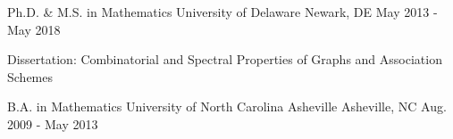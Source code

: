 \begin{cventries}
  \cventry
    {Ph.D. \& M.S. in Mathematics}
    {University of Delaware}
    {Newark, DE}
    {May 2013 - May 2018}
    {
      \begin{cvitems}
        \item {Dissertation: Combinatorial and Spectral Properties of Graphs and Association Schemes}
      \end{cvitems}
    }
  \cventry
    {B.A. in Mathematics}
    {University of North Carolina Asheville}
    {Asheville, NC}
    {Aug. 2009 - May 2013}
    {}
\end{cventries}
\vspace*{-2pt}
